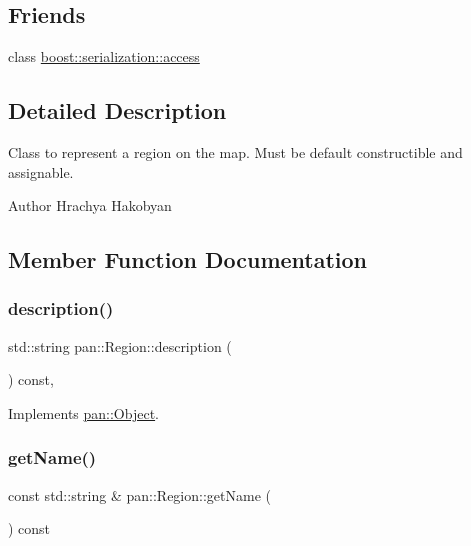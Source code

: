 \subsection*{Friends}
\begin{DoxyCompactItemize}
\item 
class \hyperlink{classpan_1_1_region_ac98d07dd8f7b70e16ccb9a01abf56b9c}{boost\+::serialization\+::access}
\end{DoxyCompactItemize}


\subsection{Detailed Description}
Class to represent a region on the map. Must be default constructible and assignable. 

\begin{DoxyAuthor}{Author}
Hrachya Hakobyan 
\end{DoxyAuthor}


\subsection{Member Function Documentation}
\mbox{\label{classpan_1_1_region_abc67a788365510bfad231939713106cb}} 
\subsubsection{\texorpdfstring{description()}{description()}}
{\footnotesize\ttfamily std\+::string pan\+::\+Region\+::description (\begin{DoxyParamCaption}{ }\end{DoxyParamCaption}) const\hspace{0.3cm}{\ttfamily [inline]}, {\ttfamily [virtual]}}



Implements \hyperlink{classpan_1_1_object_a2bb6d3117bb32f5774657c83f118ed8b}{pan\+::\+Object}.

\mbox{\label{classpan_1_1_region_a7ebfab047a556e5c95f9a7ea10eb71ba}} 
\subsubsection{\texorpdfstring{get\+Name()}{getName()}}
{\footnotesize\ttfamily const std\+::string \& pan\+::\+Region\+::get\+Name (\begin{DoxyParamCaption}{ }\end{DoxyParamCaption}) const\hspace{0.3cm}{\ttfamily [inline]}}

